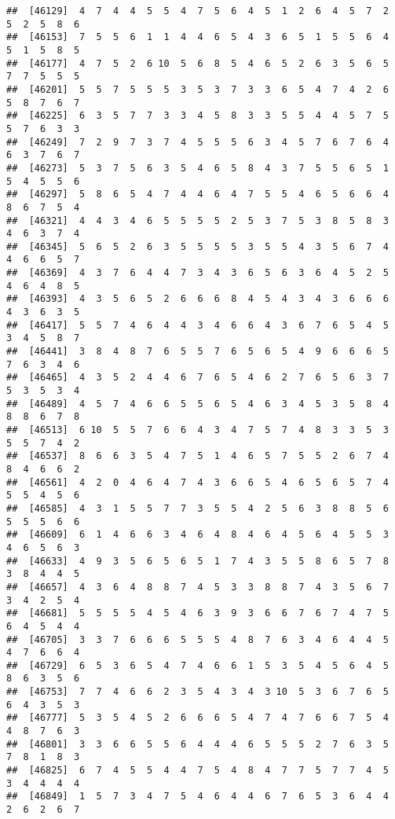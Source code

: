 \documentclass[
]{book}
\begin{document}
\begin{verbatim}
##  [46129]  4  7  4  4  5  5  4  7  5  6  4  5  1  2  6  4  5  7  2  5  2  5  8  6
##  [46153]  7  5  5  6  1  1  4  4  6  5  4  3  6  5  1  5  5  6  4  5  1  5  8  5
##  [46177]  4  7  5  2  6 10  5  6  8  5  4  6  5  2  6  3  5  6  5  7  7  5  5  5
##  [46201]  5  5  7  5  5  5  3  5  3  7  3  3  6  5  4  7  4  2  6  5  8  7  6  7
##  [46225]  6  3  5  7  7  3  3  4  5  8  3  3  5  5  4  4  5  7  5  5  7  6  3  3
##  [46249]  7  2  9  7  3  7  4  5  5  5  6  3  4  5  7  6  7  6  4  6  3  7  6  7
##  [46273]  5  3  7  5  6  3  5  4  6  5  8  4  3  7  5  5  6  5  1  5  4  5  5  6
##  [46297]  5  8  6  5  4  7  4  4  6  4  7  5  5  4  6  5  6  6  4  8  6  7  5  4
##  [46321]  4  4  3  4  6  5  5  5  5  2  5  3  7  5  3  8  5  8  3  4  6  3  7  4
##  [46345]  5  6  5  2  6  3  5  5  5  5  3  5  5  4  3  5  6  7  4  4  6  6  5  7
##  [46369]  4  3  7  6  4  4  7  3  4  3  6  5  6  3  6  4  5  2  5  4  6  4  8  5
##  [46393]  4  3  5  6  5  2  6  6  6  8  4  5  4  3  4  3  6  6  6  4  3  6  3  5
##  [46417]  5  5  7  4  6  4  4  3  4  6  6  4  3  6  7  6  5  4  5  3  4  5  8  7
##  [46441]  3  8  4  8  7  6  5  5  7  6  5  6  5  4  9  6  6  6  5  7  6  3  4  6
##  [46465]  4  3  5  2  4  4  6  7  6  5  4  6  2  7  6  5  6  3  7  5  3  5  3  4
##  [46489]  4  5  7  4  6  6  5  5  6  5  4  6  3  4  5  3  5  8  4  8  8  6  7  8
##  [46513]  6 10  5  5  7  6  6  4  3  4  7  5  7  4  8  3  3  5  3  5  5  7  4  2
##  [46537]  8  6  6  3  5  4  7  5  1  4  6  5  7  5  5  2  6  7  4  8  4  6  6  2
##  [46561]  4  2  0  4  6  4  7  4  3  6  6  5  4  6  5  6  5  7  4  5  5  4  5  6
##  [46585]  4  3  1  5  5  7  7  3  5  5  4  2  5  6  3  8  8  5  6  5  5  5  6  6
##  [46609]  6  1  4  6  6  3  4  6  4  8  4  6  4  5  6  4  5  5  3  4  6  5  6  3
##  [46633]  4  9  3  5  6  5  6  5  1  7  4  3  5  5  8  6  5  7  8  3  8  4  4  5
##  [46657]  4  3  6  4  8  8  7  4  5  3  3  8  8  7  4  3  5  6  7  3  4  2  5  4
##  [46681]  5  5  5  5  4  5  4  6  3  9  3  6  6  7  6  7  4  7  5  6  4  5  4  4
##  [46705]  3  3  7  6  6  6  5  5  5  4  8  7  6  3  4  6  4  4  5  4  7  6  6  4
##  [46729]  6  5  3  6  5  4  7  4  6  6  1  5  3  5  4  5  6  4  5  8  6  3  5  6
##  [46753]  7  7  4  6  6  2  3  5  4  3  4  3 10  5  3  6  7  6  5  6  4  3  5  3
##  [46777]  5  3  5  4  5  2  6  6  6  5  4  7  4  7  6  6  7  5  4  4  8  7  6  3
##  [46801]  3  3  6  6  5  5  6  4  4  4  6  5  5  5  2  7  6  3  5  7  8  1  8  3
##  [46825]  6  7  4  5  5  4  4  7  5  4  8  4  7  7  5  7  7  4  5  3  4  4  4  4
##  [46849]  1  5  7  3  4  7  5  4  6  4  4  6  7  6  5  3  6  4  4  2  6  2  6  7

\end{verbatim}
\end{document}
